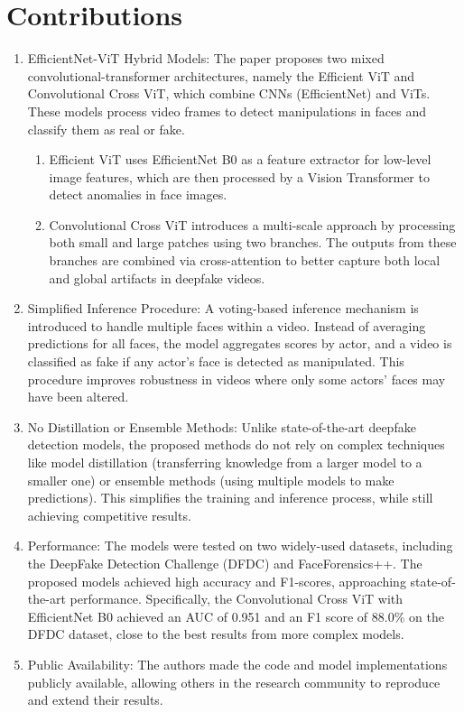 \documentclass{report}
\begin{document}
	 \section{Contributions}
	 \begin{enumerate}
	 	\item 
	 	EfficientNet-ViT Hybrid Models: The paper proposes two mixed convolutional-transformer architectures, namely the Efficient ViT and Convolutional Cross ViT, which combine CNNs (EfficientNet) and ViTs. These models process video frames to detect manipulations in faces and classify them as real or fake.
	 	\begin{enumerate}
	 		\item 
	 		Efficient ViT uses EfficientNet B0 as a feature extractor for low-level image features, which are then processed by a Vision Transformer to detect anomalies in face images.
	 		
	 		\item 
	 		Convolutional Cross ViT introduces a multi-scale approach by processing both small and large patches using two branches. The outputs from these branches are combined via cross-attention to better capture both local and global artifacts in deepfake videos.
	 	\end{enumerate}
	 	\item
	 	Simplified Inference Procedure: A voting-based inference mechanism is introduced to handle multiple faces within a video. Instead of averaging predictions for all faces, the model aggregates scores by actor, and a video is classified as fake if any actor's face is detected as manipulated. This procedure improves robustness in videos where only some actors’ faces may have been altered.
	 	
	 	\item
	 	No Distillation or Ensemble Methods: Unlike state-of-the-art deepfake detection models, the proposed methods do not rely on complex techniques like model distillation (transferring knowledge from a larger model to a smaller one) or ensemble methods (using multiple models to make predictions). This simplifies the training and inference process, while still achieving competitive results.
	 	
	 	\item 
	 	Performance: The models were tested on two widely-used datasets, including the DeepFake Detection Challenge (DFDC) and FaceForensics++. The proposed models achieved high accuracy and F1-scores, approaching state-of-the-art performance. Specifically, the Convolutional Cross ViT with EfficientNet B0 achieved an AUC of 0.951 and an F1 score of 88.0\% on the DFDC dataset, close to the best results from more complex models.
	 	
	 	\item 
	 	Public Availability: The authors made the code and model implementations publicly available, allowing others in the research community to reproduce and extend their results.
	 \end{enumerate}
	 
\end{document}
